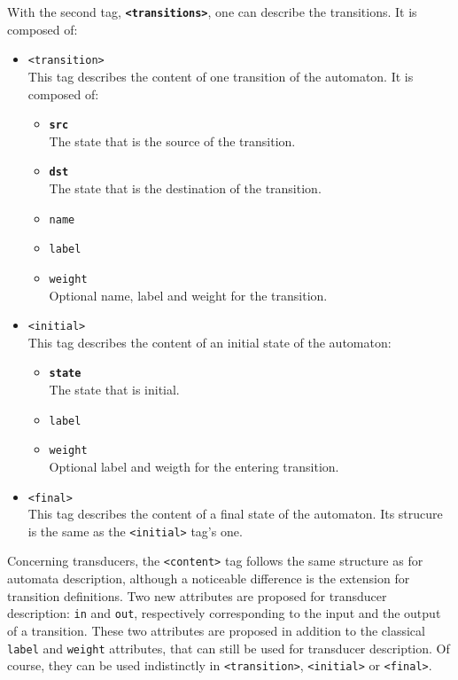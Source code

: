 \documentclass[a4paper]{article}
\newcommand{\xtag}[1]{\texttt{<#1>}}
\newcommand{\xattr}[1]{\texttt{#1}}
\def\contenttag{\xtag{content}}
\def\transitionstag{\xtag{transitions}}
\def\transitiontag{\xtag{transition}}
\def\finaltag{\xtag{final}}
\def\initialtag{\xtag{initial}}
\begin{document}
With the second tag, \textbf{\transitionstag{}}, one can describe the
transitions. It is composed of:
\begin{itemize}
\item \transitiontag{}\\
  This tag describes the content of one transition of the automaton.
  It is composed of:
  \begin{itemize}
  \item \xattr{\textbf{src}}\\
    The state that is the source of the transition.
  \item \xattr{\textbf{dst}}\\
    The state that is the destination of the transition.
  \item \xattr{name}
  \item \xattr{label}
  \item \xattr{weight}\\
    Optional name, label and weight for the transition.
  \end{itemize}
\item \initialtag{}\\
  This tag describes the content of an initial state of the automaton:
  \begin{itemize}
  \item \xattr{\textbf{state}}\\
    The state that is initial.
  \item \xattr{label}
  \item \xattr{weight}\\
    Optional label and weigth for the entering transition.
  \end{itemize}
\item \finaltag{}\\
  This tag describes the content of a final state of the automaton.
  Its strucure is the same as the \initialtag{} tag's one.
\end{itemize}

Concerning transducers, the \contenttag{} tag follows the same
structure as for automata description, although a noticeable
difference is the extension for transition definitions. Two new
attributes are proposed for transducer description: \verb|in| and
\verb|out|, respectively corresponding to the input and the output of
a transition. These two attributes are proposed in addition to the
classical \verb|label| and \verb|weight| attributes, that can still be
used for transducer description. Of course, they can be used
indistinctly in \transitiontag{}, \initialtag{} or \finaltag{}.
\end{document}
